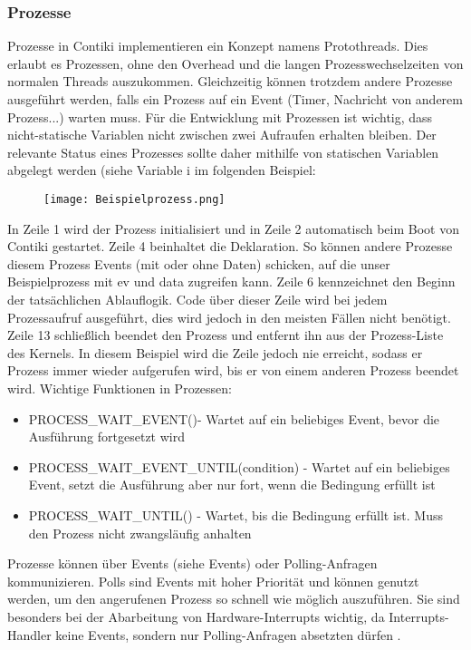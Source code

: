 \subsubsection{Prozesse}
Prozesse in Contiki implementieren ein Konzept namens Protothreads. Dies erlaubt es Prozessen, ohne den Overhead und die langen Prozesswechselzeiten von normalen Threads auszukommen. Gleichzeitig k\"onnen trotzdem andere Prozesse ausgef\"uhrt werden, falls ein Prozess auf ein Event (Timer, Nachricht von anderem Prozess...) warten muss. F\"ur die Entwicklung mit Prozessen ist wichtig, dass nicht-statische Variablen nicht zwischen zwei Aufraufen erhalten bleiben. Der relevante Status eines Prozesses sollte daher mithilfe von statischen Variablen abgelegt werden (siehe Variable i im folgenden Beispiel:

\begin{figure}[h!]
	\centering
		\texttt{[image: Beispielprozess.png]}
	\label{Beispielprozess}
\end{figure}
In Zeile 1 wird der Prozess initialisiert und in Zeile 2 automatisch beim Boot von Contiki gestartet. Zeile 4 beinhaltet die Deklaration. So k\"onnen andere Prozesse diesem Prozess Events (mit oder ohne Daten) schicken, auf die unser Beispielprozess mit ev und data zugreifen kann. Zeile 6 kennzeichnet den Beginn der tats\"achlichen Ablauflogik. Code \"uber dieser Zeile wird bei jedem Prozessaufruf ausgef\"uhrt, dies wird jedoch in den meisten F\"allen nicht ben\"otigt. Zeile 13 schlie{\ss}lich beendet den Prozess und entfernt ihn aus der Prozess-Liste des Kernels. In diesem Beispiel wird die Zeile jedoch nie erreicht, sodass er Prozess immer wieder aufgerufen wird, bis er von einem anderen Prozess beendet wird.
Wichtige Funktionen in Prozessen:
\begin{itemize}
\item PROCESS\_WAIT\_EVENT()- Wartet auf ein beliebiges Event, bevor die Ausf\"{u}hrung fortgesetzt wird
\item PROCESS\_WAIT\_EVENT\_UNTIL(condition) - Wartet auf ein beliebiges Event, setzt die Ausf\"{u}hrung aber nur fort, wenn die Bedingung erf\"{u}llt ist
\item PROCESS\_WAIT\_UNTIL() - Wartet, bis die Bedingung erf\"ullt ist. Muss den Prozess nicht zwangsl\"{a}ufig anhalten
\end{itemize}
Prozesse k\"onnen \"uber Events (siehe Events) oder Polling-Anfragen kommunizieren.  Polls sind Events mit hoher Priorit\"at und k\"onnen genutzt werden, um den angerufenen Prozess so schnell wie m\"oglich auszuf\"uhren. Sie
sind besonders bei der Abarbeitung von Hardware-Interrupts wichtig, da Interrupts-Handler keine Events, sondern nur
Polling-Anfragen absetzten d\"urfen \cite[S. 7]{Walter:2010}.